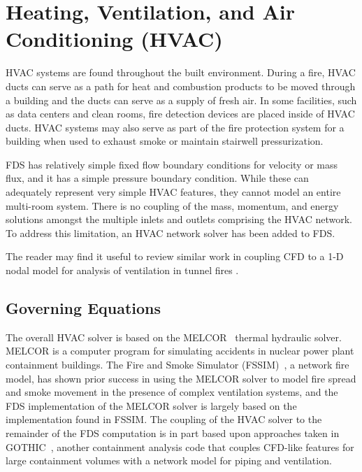 

\chapter{Heating, Ventilation, and Air Conditioning (HVAC)}

HVAC systems are found throughout the built environment.  During a fire, HVAC ducts can serve as a path for heat and combustion products to be moved through a building and the ducts can serve as a supply of fresh air.  In some facilities, such as data centers and clean rooms, fire detection devices are placed inside of HVAC ducts. HVAC systems may also serve as part of the fire protection system for a building when used to exhaust smoke or maintain stairwell pressurization.

FDS has relatively simple fixed flow boundary conditions for velocity or mass flux, and it has a simple pressure boundary condition. While these can adequately represent very simple HVAC features, they cannot model an entire multi-room system. There is no coupling of the mass, momentum, and energy solutions amongst the multiple inlets and outlets comprising the HVAC network. To address this limitation, an HVAC network solver has been added to FDS.

The reader may find it useful to review similar work in coupling CFD to a 1-D nodal model for analysis of ventilation in tunnel fires \cite{Colella:2010, Colella:2011}.


\section{Governing Equations}

The overall HVAC solver is based on the MELCOR~\cite{MELCOR} thermal hydraulic solver.  MELCOR is a computer program for simulating accidents in nuclear power plant containment buildings.
The Fire and Smoke Simulator (FSSIM)~\cite{FSSIM}, a network fire model, has shown prior success in using the MELCOR solver to model fire spread and smoke movement
in the presence of complex ventilation systems, and the FDS implementation of the MELCOR solver is largely based on the implementation found in FSSIM.  The coupling of the HVAC solver to the remainder of the FDS computation is in part based upon approaches taken in GOTHIC~\cite{GOTHIC}, another containment analysis code that couples CFD-like features for large containment volumes with a network model for piping and ventilation.


